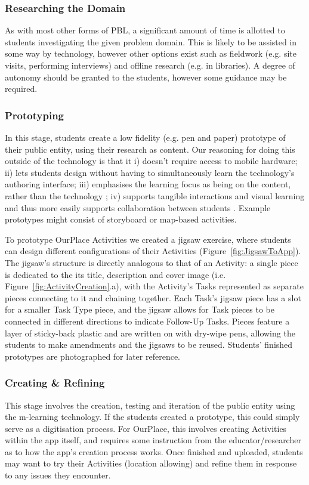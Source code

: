 \documentclass[,hyphens]{sigchi}
\begin{document}
\subsubsection{Researching the Domain}
As with most other forms of PBL, a significant amount of time is allotted to students investigating the given problem domain. This is likely to be assisted in some way by technology, however other options exist such as fieldwork (e.g. site visits, performing interviews) and offline research (e.g. in libraries). A degree of autonomy should be granted to the students, however some guidance may be required.

\subsubsection{Prototyping}
In this stage, students create a low fidelity (e.g. pen and paper) prototype of their public entity, using their research as content. Our reasoning for doing this outside of the technology is that it i) doesn't require access to mobile hardware; ii) lets students design without having to simultaneously learn the technology's authoring interface; iii) emphasises the learning focus as being on the content, rather than the technology \cite{Bell2010}; iv) supports tangible interactions and visual learning and thus more easily supports collaboration between students \cite{Stanton2001}. Example prototypes might consist of storyboard or map-based activities.

To prototype OurPlace Activities we created a jigsaw exercise, where students can design different configurations of their Activities (Figure~\ref{fig:JigsawToApp}). The jigsaw's structure is directly analogous to that of an Activity: a single piece is dedicated to the its title, description and cover image (i.e. Figure~\ref{fig:ActivityCreation}.a), with the Activity's Tasks represented as separate pieces connecting to it and chaining together. Each Task's jigsaw piece has a slot for a smaller Task Type piece, and the jigsaw allows for Task pieces to be connected in different directions to indicate Follow-Up Tasks. Pieces feature a layer of sticky-back plastic and are written on with dry-wipe pens, allowing the students to make amendments and the jigsaws to be reused. Students' finished prototypes are photographed for later reference.

\subsubsection{Creating \& Refining}
This stage involves the creation, testing and iteration of the public entity using the m-learning technology. If the students created a prototype, this could simply serve as a digitisation process. For OurPlace, this involves creating Activities within the app itself, and requires some instruction from the educator/researcher as to how the app's creation process works. Once finished and uploaded, students may want to try their Activities (location allowing) and refine them in response to any issues they encounter. 
\end{document}
